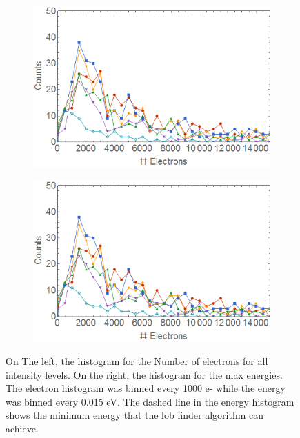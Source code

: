 \begin{figure}[h!]
\centering
\begin{subfigure}[l]{0.49\textwidth}
\includegraphics[width=1\textwidth]{../Images/results/MIR_He_waterIntensityscan/Helect.png} 
\end{subfigure}
\begin{subfigure}[l]{0.49\textwidth}
\includegraphics[width=1\textwidth]{../Images/results/MIR_He_waterIntensityscan/Helect.png}   				\end{subfigure}
\caption[MIR He-intensity dependence. Histogram]{On The left, the histogram for the Number of electrons for all intensity levels. On the right, the histogram for the max energies. The electron histogram was binned every 1000 e- while the energy was binned every 0.015 eV. The dashed line in the energy histogram shows the minimum energy that the lob finder algorithm can achieve.}
\label{fig:intehisto}
\end{figure}
 
